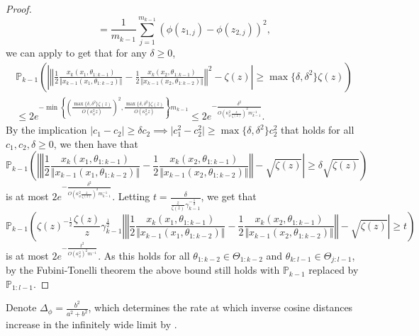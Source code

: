 \documentclass[twoside,11pt]{article}
\newcommand{\Prob}{\mathbb{P}}
\begin{document}
\begin{proof}
\[= \frac{1}{m_{k-1}} \sum_{j=1}^{m_{k-1}} (\phi(z_{1,j}) - \phi(z_{2,j}))^2,
\]
we can apply \citet[Corollary~2.8.3]{Vershynin2018} to get that for any $\delta \geq 0$,
\begin{multline*}
\Prob_{k-1}\left( \left\vert \left\Vert \frac{1}{2} \frac{x_k(x_1, \theta_{1 : k-1})}{\Vert x_{k-1}(x_1, \theta_{1 : k-2}) \Vert} - \frac{1}{2} \frac{x_k(x_2, \theta_{1 : k-1})}{\Vert x_{k-1}(x_2, \theta_{1 : k-2}) \Vert} \right\Vert^2 - \zeta(z) \right\vert 
\geq \max\{ \delta, \delta^2 \} \zeta(z) \right) \\
\leq 2e^{-\min\left\{ \left( \frac{\max\{ \delta, \delta^2 \} \zeta(z)}{O(\kappa_\phi^2 z)} \right)^2, \frac{\max\{ \delta, \delta^2 \} \zeta(z)}{O(\kappa_\phi^2 z)} \right\} m_{k-1}}
\leq 2e^{-\frac{\delta^2}{O(\kappa_\phi^2 \frac{z}{\zeta(z)})^2 m_{k-1}^{-1}}}.
\end{multline*}
By the implication $\vert c_1 - c_2 \vert \geq \delta c_2 \implies \vert c_1^2 - c_2^2 \vert \geq \max\{ \delta, \delta^2 \} c_2^2$ that holds for all $c_1, c_2, \delta \geq 0$, we then have that
\[
\Prob_{k-1}\left( \left\vert \left\Vert \frac{1}{2} \frac{x_k(x_1, \theta_{1 : k-1})}{\Vert x_{k-1}(x_1, \theta_{1 : k-2}) \Vert} - \frac{1}{2} \frac{x_k(x_2, \theta_{1 : k-1})}{\Vert x_{k-1}(x_2, \theta_{1 : k-2}) \Vert} \right\Vert - \sqrt{\zeta(z)} \right\vert \geq \delta \sqrt{\zeta(z)} \right)
\]
is at most $2e^{-\frac{\delta^2}{O(\kappa_\phi^2 \frac{z}{\zeta(z)})^2 m_{k-1}^{-1}}}$. Letting $t = \frac{\delta}{\frac{z}{\zeta(z)} \gamma_{k-1}^{-\frac{1}{2}}}$, we get that
\[
\Prob_{k-1}\left( \zeta(z)^{-\frac{1}{2}} \frac{\zeta(z)}{z} \gamma_{k-1}^{\frac{1}{2}} \left\vert \left\Vert \frac{1}{2} \frac{x_k(x_1, \theta_{1 : k-1})}{\Vert x_{k-1}(x_1, \theta_{1 : k-2}) \Vert} - \frac{1}{2} \frac{x_k(x_2, \theta_{1 : k-1})}{\Vert x_{k-1}(x_2, \theta_{1 : k-2}) \Vert} \right\Vert - \sqrt{\zeta(z)} \right\vert \geq t \right)
\]
is at most $2e^{-\frac{t^2}{O(\kappa_\phi^2)^2 m^{-1}}}$. As this holds for all $\theta_{1:k-2} \in \Theta_{1:k-2}$ and $\theta_{k:l-1} \in \Theta_{j:l-1}$, by the Fubini-Tonelli theorem the above bound still holds with $\Prob_{k-1}$ replaced by $\Prob_{1:l-1}$.
\end{proof}

Denote $\Delta_\phi = \frac{b^2}{a^2+b^2}$, which determines the rate at which inverse cosine distances increase in the infinitely wide limit by \citet[Proposition~13]{mlpsateoc1}.
\end{document}
